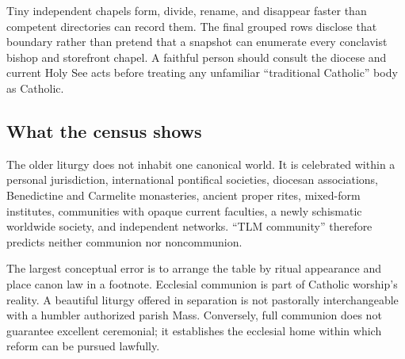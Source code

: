 Tiny independent chapels form, divide, rename, and disappear faster than competent directories can record them. The final grouped rows disclose that boundary rather than pretend that a snapshot can enumerate every conclavist bishop and storefront chapel. A faithful person should consult the diocese and current Holy See acts before treating any unfamiliar “traditional Catholic” body as Catholic.

\subsection{What the census shows}

The older liturgy does not inhabit one canonical world. It is celebrated within a personal jurisdiction, international pontifical societies, diocesan associations, Benedictine and Carmelite monasteries, ancient proper rites, mixed-form institutes, communities with opaque current faculties, a newly schismatic worldwide society, and independent networks. “TLM community” therefore predicts neither communion nor noncommunion.

The largest conceptual error is to arrange the table by ritual appearance and place canon law in a footnote. Ecclesial communion is part of Catholic worship's reality. A beautiful liturgy offered in separation is not pastorally interchangeable with a humbler authorized parish Mass. Conversely, full communion does not guarantee excellent ceremonial; it establishes the ecclesial home within which reform can be pursued lawfully.

